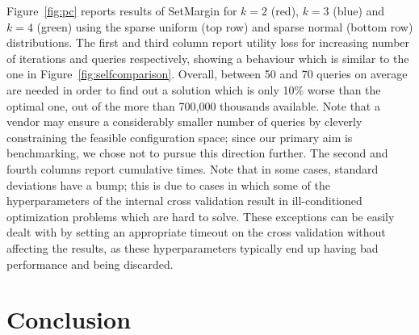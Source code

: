 \documentclass{article}
\renewcommand\[{\begin{equation}}
\renewcommand\]{\end{equation}}
\begin{document}
Figure~\ref{fig:pc} reports results of {\sc SetMargin} for $k=2$
(red), $k=3$ (blue) and $k=4$ (green) using the sparse uniform (top
row) and sparse normal (bottom row) distributions. The first and third
column report utility loss for increasing number of iterations and
queries respectively, showing a behaviour which is similar to the one
in Figure~\ref{fig:selfcomparison}. Overall, between 50 and 70 queries
on average are needed in order to find out a solution which is only
10\% worse than the optimal one, out of the more than 700,000
thousands available. Note that a vendor may ensure a considerably smaller
number of queries by cleverly constraining the feasible configuration space;
since our primary aim is benchmarking, we chose not to pursue this direction
further.
The second and fourth
columns report cumulative times. Note that in some cases, standard
deviations have a bump; this is due to cases in which some of the
hyperparameters of the internal cross validation result in
ill-conditioned optimization problems which are hard to solve. These
exceptions can be easily dealt with by setting an appropriate timeout
on the cross validation without affecting the results, as these
hyperparameters typically end up having bad performance and being
discarded.



\section{Conclusion}
\label{sec:conclusions}
\end{document}

